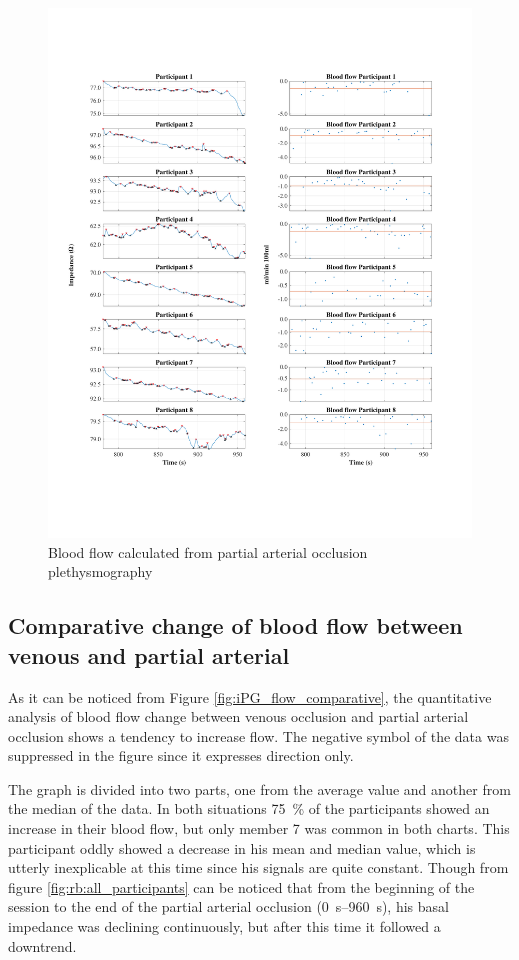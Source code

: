 \begin{figure}
	\includegraphics[width=\textwidth,height=\textheight,keepaspectratio,trim={0.5cm 0.5cm 2cm 2cm},clip]{figure13}    
	\caption{Blood flow calculated from partial arterial occlusion plethysmography}
	\label{fig:blood_flow:arterial_occlusion}
\end{figure}

\subsection{Comparative change of blood flow between venous and partial arterial}
\label{section results 4.3}
As it can be noticed from Figure \ref{fig:iPG_flow_comparative}, the quantitative analysis of blood flow change between venous occlusion and partial arterial occlusion shows a tendency to increase flow. The negative symbol of the data was suppressed in the figure since it expresses direction only. 

The graph is divided into two parts, one from the average value and another from the median of the data.  In both situations \SI{75}{\percent} of the participants showed an increase in their blood flow, but only member 7 was common in both charts. This participant oddly showed a decrease in his mean and median value, which is utterly inexplicable at this time since his signals are quite constant. Though from figure \ref{fig:rb:all_participants} can be noticed that from the beginning of the session to the end of the partial arterial occlusion  (\SIrange{0}{960}{\second}), his basal impedance was declining continuously, but after this time it followed a downtrend. 

